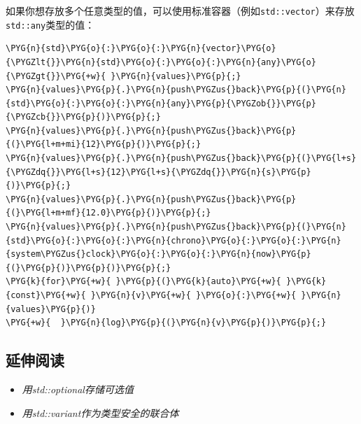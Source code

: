 
如果你想存放多个任意类型的值，可以使用标准容器（例如\texttt{std::\allowbreak{}vector}）来存放\texttt{std::\allowbreak{}any}类型的值：



\begin{codeblockbg}
\begin{Verbatim}[commandchars=\\\{\},breaklines=true,breakanywhere=true,fontsize=\codefont,xleftmargin=17bp]
\PYG{n}{std}\PYG{o}{:}\PYG{o}{:}\PYG{n}{vector}\PYG{o}{\PYGZlt{}}\PYG{n}{std}\PYG{o}{:}\PYG{o}{:}\PYG{n}{any}\PYG{o}{\PYGZgt{}}\PYG{+w}{ }\PYG{n}{values}\PYG{p}{;}
\PYG{n}{values}\PYG{p}{.}\PYG{n}{push\PYGZus{}back}\PYG{p}{(}\PYG{n}{std}\PYG{o}{:}\PYG{o}{:}\PYG{n}{any}\PYG{p}{\PYGZob{}}\PYG{p}{\PYGZcb{}}\PYG{p}{)}\PYG{p}{;}
\PYG{n}{values}\PYG{p}{.}\PYG{n}{push\PYGZus{}back}\PYG{p}{(}\PYG{l+m+mi}{12}\PYG{p}{)}\PYG{p}{;}
\PYG{n}{values}\PYG{p}{.}\PYG{n}{push\PYGZus{}back}\PYG{p}{(}\PYG{l+s}{\PYGZdq{}}\PYG{l+s}{12}\PYG{l+s}{\PYGZdq{}}\PYG{n}{s}\PYG{p}{)}\PYG{p}{;}
\PYG{n}{values}\PYG{p}{.}\PYG{n}{push\PYGZus{}back}\PYG{p}{(}\PYG{l+m+mf}{12.0}\PYG{p}{)}\PYG{p}{;}
\PYG{n}{values}\PYG{p}{.}\PYG{n}{push\PYGZus{}back}\PYG{p}{(}\PYG{n}{std}\PYG{o}{:}\PYG{o}{:}\PYG{n}{chrono}\PYG{o}{:}\PYG{o}{:}\PYG{n}{system\PYGZus{}clock}\PYG{o}{:}\PYG{o}{:}\PYG{n}{now}\PYG{p}{(}\PYG{p}{)}\PYG{p}{)}\PYG{p}{;}
\PYG{k}{for}\PYG{+w}{ }\PYG{p}{(}\PYG{k}{auto}\PYG{+w}{ }\PYG{k}{const}\PYG{+w}{ }\PYG{n}{v}\PYG{+w}{ }\PYG{o}{:}\PYG{+w}{ }\PYG{n}{values}\PYG{p}{)}
\PYG{+w}{  }\PYG{n}{log}\PYG{p}{(}\PYG{n}{v}\PYG{p}{)}\PYG{p}{;}
\end{Verbatim}
\end{codeblockbg}



\subsection{延伸阅读}



\begin{itemize}
\item \textit{用std::optional存储可选值}



\item \textit{用std::variant作为类型安全的联合体}

\end{itemize}



